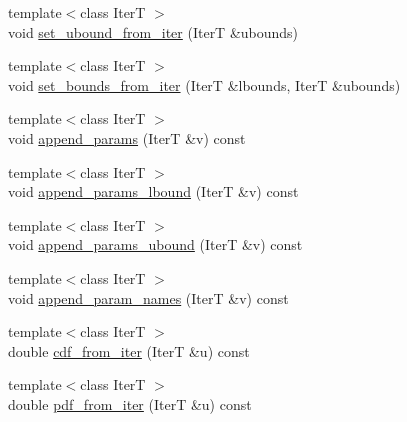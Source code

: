 \begin{DoxyCompactItemize}
\item 
{\footnotesize template$<$class IterT $>$ }\\void \hyperlink{classprior__hessian_1_1CompositeDist_1_1ComponentDistAdaptor_3_01Dist_00_01meta_1_1EnableIfSubclc6c9bd83bba546a81e521c87ad7ee6d3_abfea7c6fbeb97cd05a98d8af6f04fbe6}{set\+\_\+ubound\+\_\+from\+\_\+iter} (IterT \&ubounds)
\item 
{\footnotesize template$<$class IterT $>$ }\\void \hyperlink{classprior__hessian_1_1CompositeDist_1_1ComponentDistAdaptor_3_01Dist_00_01meta_1_1EnableIfSubclc6c9bd83bba546a81e521c87ad7ee6d3_a1cb151ed3a8fdb310c8755512cbcb2ec}{set\+\_\+bounds\+\_\+from\+\_\+iter} (IterT \&lbounds, IterT \&ubounds)
\item 
{\footnotesize template$<$class IterT $>$ }\\void \hyperlink{classprior__hessian_1_1CompositeDist_1_1ComponentDistAdaptor_3_01Dist_00_01meta_1_1EnableIfSubclc6c9bd83bba546a81e521c87ad7ee6d3_a77177345ebf003c453a3850d370d18b4}{append\+\_\+params} (IterT \&v) const 
\item 
{\footnotesize template$<$class IterT $>$ }\\void \hyperlink{classprior__hessian_1_1CompositeDist_1_1ComponentDistAdaptor_3_01Dist_00_01meta_1_1EnableIfSubclc6c9bd83bba546a81e521c87ad7ee6d3_a4f45c6804e5d2afcc16fca48138ab80a}{append\+\_\+params\+\_\+lbound} (IterT \&v) const 
\item 
{\footnotesize template$<$class IterT $>$ }\\void \hyperlink{classprior__hessian_1_1CompositeDist_1_1ComponentDistAdaptor_3_01Dist_00_01meta_1_1EnableIfSubclc6c9bd83bba546a81e521c87ad7ee6d3_a8c72095f27b6a3f45e06a55079e2442e}{append\+\_\+params\+\_\+ubound} (IterT \&v) const 
\item 
{\footnotesize template$<$class IterT $>$ }\\void \hyperlink{classprior__hessian_1_1CompositeDist_1_1ComponentDistAdaptor_3_01Dist_00_01meta_1_1EnableIfSubclc6c9bd83bba546a81e521c87ad7ee6d3_a75bbad1826eb579d89540607f59f3919}{append\+\_\+param\+\_\+names} (IterT \&v) const 
\item 
{\footnotesize template$<$class IterT $>$ }\\double \hyperlink{classprior__hessian_1_1CompositeDist_1_1ComponentDistAdaptor_3_01Dist_00_01meta_1_1EnableIfSubclc6c9bd83bba546a81e521c87ad7ee6d3_a55aae1bd431bcd8f1b2015e3e8ab240e}{cdf\+\_\+from\+\_\+iter} (IterT \&u) const 
\item 
{\footnotesize template$<$class IterT $>$ }\\double \hyperlink{classprior__hessian_1_1CompositeDist_1_1ComponentDistAdaptor_3_01Dist_00_01meta_1_1EnableIfSubclc6c9bd83bba546a81e521c87ad7ee6d3_ae9a5a17c12846459bd28e31fa59cb170}{pdf\+\_\+from\+\_\+iter} (IterT \&u) const 

\end{DoxyCompactItemize}
